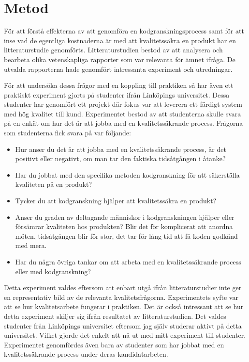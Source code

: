 \section{Metod}
\label{sec:method-wallstrom}

För att förstå effekterna av att genomföra en kodgranskningsprocess samt för att inse vad de egentliga kostnaderna är med att kvalitetssäkra en produkt har en litteraturstudie genomförts. Litteraturstudien bestod av att analysera och bearbeta olika vetenskapliga rapporter som var relevanta för ämnet ifråga. De utvalda rapporterna hade genomfört intressanta experiment och utredningar.

För att undersöka dessa frågor med en koppling till praktiken så har även ett praktiskt experiment gjorts på studenter ifrån Linköpings universitet. Dessa studenter har genomfört ett projekt där fokus var att leverera ett färdigt system med hög kvalitet till kund. Experimentet bestod av att studenterna skulle svara på en enkät om hur det är att jobba med en kvalitetssäkrande process. Frågorna som studenterna fick svara på var följande:

\begin{itemize}
	\item Hur anser du det är att jobba med en kvalitetssäkrande process, är det positivt eller negativt, om man tar den faktiska tidsåtgången i åtanke?
	\item Har du jobbat med den specifika metoden kodgranskning för att säkerställa kvaliteten på en produkt?
	\item Tycker du att kodgranskning hjälper att kvalitetssäkra en produkt?
	\item Anser du graden av deltagande människor i kodgranskningen hjälper eller försämrar kvaliteten hos produkten? Blir det för komplicerat att anordna möten, tidsåtgången blir för stor, det tar för lång tid att få koden godkänd med mera.
	\item Har du några övriga tankar om att arbeta med en kvalitetssäkrande process eller med kodgranskning?
\end{itemize}

Detta experiment valdes eftersom att enbart utgå ifrån litteraturstudier inte ger en representativ bild av de relevanta kvalitetsfrågorna. Experimentets syfte var att se hur kvalitets\-arbete fungerar i praktiken. Det är också intressant att se hur detta experiment skiljer sig ifrån resultatet av litteraturstudien. Det valdes studenter från Linköpings universitet eftersom jag själv studerar aktivt på detta universitet. Vilket gjorde det enkelt att nå ut med mitt experiment till studenter. Experimentet genomfördes även bara av studenter som har jobbat med en kvalitetssäkrande process under deras kandidatarbeten.

